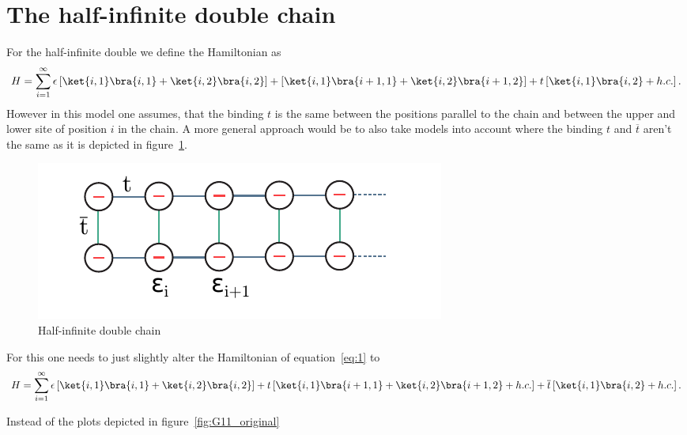 \section{The half-infinite double chain}

For the half-infinite double we define the Hamiltonian as
\begin{equation}
  \label{eq:1}
  H = \sum_{i = 1}^{\infty}\epsilon\left[\ket{i,1}\bra{i,1}+\ket{i,2}\bra{i,2}\right]+\left[\ket{i, 1}\bra{i+1,
      1}+\ket{i,2}\bra{i+1, 2}\right]+t\left[\ket{i,1}\bra{i,2}+h.c.\right].
\end{equation}
However in this model one assumes, that the binding $t$ is the same
between the positions parallel to the chain and between the upper and
lower site of position $i$ in the chain.
A more general approach would be to also take models into account
where the binding $t$ and $\overline{t}$ aren't the same as it is
depicted in figure~\ref{fig:half-inf-double-chain}.

\begin{figure}[hbt!]
  \centering
  \includegraphics{pics/double_chain_different_t.pdf}
  \caption{Half-infinite double chain}
  \label{fig:half-inf-double-chain}
\end{figure}

For this one needs to just slightly alter the Hamiltonian of equation~\ref{eq:1} to
\begin{equation}
  \label{eq:2}
  H = \sum_{i = 1}^{\infty}\epsilon\left[\ket{i,1}\bra{i,1}+\ket{i,2}\bra{i,2}\right]+t\left[\ket{i, 1}\bra{i+1,
      1}+\ket{i,2}\bra{i+1, 2}+h.c.\right]+\overline{t}\left[\ket{i,1}\bra{i,2}+h.c.\right].
\end{equation}

Instead of the plots depicted in figure~\ref{fig:G11_original}

